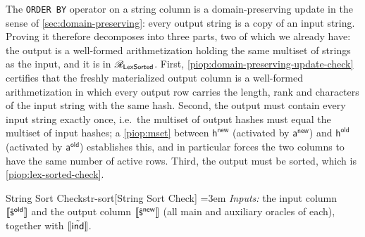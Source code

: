 The \texttt{ORDER BY} operator on a string column is a domain-preserving update in the sense of \cref{sec:domain-preserving}: every output string is a copy of an input string. Proving it therefore decomposes into three parts, two of which we already have: the output is a well-formed arithmetization holding the same multiset of strings as the input, and it is in $\mathscr{R}_{\mathsf{LexSorted}}$. First, \cref{piop:domain-preserving-update-check} certifies that the freshly materialized output column is a well-formed arithmetization in which every output row carries the length, rank and characters of the input string with the same hash. Second, the output must contain every input string exactly once, i.e.\ the multiset of output hashes must equal the multiset of input hashes; a \cref{piop:mset} between $\mathsf{h}^{\mathsf{new}}$ (activated by $\mathsf{a}^{\mathsf{new}}$) and $\mathsf{h}^{\mathsf{old}}$ (activated by $\mathsf{a}^{\mathsf{old}}$) establishes this, and in particular forces the two columns to have the same number of active rows. Third, the output must be sorted, which is \cref{piop:lex-sorted-check}.

\begin{DefinePIOP}{String Sort Check}{str-sort}[String Sort Check]
  \emergencystretch=3em\relax
  \emph{Inputs:} the input column $\llbracket\hat{\mathsf{s}}^{\mathsf{old}}\rrbracket$ and the output column $\llbracket\hat{\mathsf{s}}^{\mathsf{new}}\rrbracket$ (all main and auxiliary oracles of each), together with $\llbracket\tilde{\mathsf{ind}}\rrbracket$.
  \vspace{2mm}
\end{DefinePIOP}

